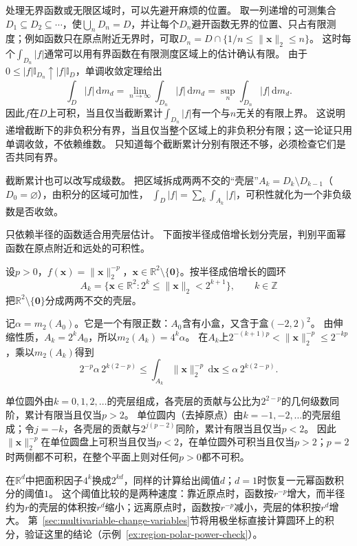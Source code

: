 处理无界函数或无限区域时，可以先避开麻烦的位置。
取一列递增的可测集合$D_1\subseteq D_2\subseteq\cdots$，使$\bigcup_nD_n=D$，并让每个$D_n$避开函数无界的位置、只占有限测度；例如函数只在原点附近无界时，可取$D_n=D\cap\{1/n\leq\lVert\bm x\rVert_2\leq n\}$。
这时每个$\int_{D_n}|f|$通常可以用有界函数在有限测度区域上的估计确认有限。
由于$0\leq|f|\mathbb I_{D_n}\uparrow|f|\mathbb I_D$，单调收敛定理给出
\[
 \int_D|f|\,\mathrm dm_d
 =\lim_{n\to\infty}\int_{D_n}|f|\,\mathrm dm_d
 =\sup_n\int_{D_n}|f|\,\mathrm dm_d.
\]
因此$f$在$D$上可积，当且仅当截断累计$\int_{D_n}|f|$有一个与$n$无关的有限上界。
这说明递增截断下的非负积分有界，当且仅当整个区域上的非负积分有限；这一论证只用单调收敛，不依赖维数。
只知道每个截断累计分别有限还不够，必须检查它们是否共同有界。

截断累计也可以改写成级数。
把区域拆成两两不交的“壳层”$A_k=D_k\setminus D_{k-1}$（$D_0=\varnothing$），由积分的区域可加性，
$\int_D|f|=\sum_k\int_{A_k}|f|$，可积性就化为一个非负级数是否收敛。

只依赖半径的函数适合用壳层估计。
下面按半径成倍增长划分壳层，判别平面幂函数在原点附近和远处的可积性。
\begin{example}
\label{ex:region-power-function-threshold}
设$p>0$，$f(\bm x)=\lVert\bm x\rVert_2^{-p}$，$\bm x\in\mathbb R^2\setminus\{\bm 0\}$。按半径成倍增长的圆环
\[
 A_k=\{\bm x\in\mathbb R^2:2^k\leq\lVert\bm x\rVert_2<2^{k+1}\},\qquad k\in\mathbb Z
\]
把$\mathbb R^2\setminus\{\bm 0\}$分成两两不交的壳层。

记$\alpha=m_2(A_0)$。它是一个有限正数：$A_0$含有小盒，又含于盒$(-2,2)^2$。
由伸缩性质，$A_k=2^kA_0$，所以$m_2(A_k)=4^k\alpha$。
在$A_k$上$2^{-(k+1)p}<\lVert\bm x\rVert_2^{-p}\leq2^{-kp}$，乘以$m_2(A_k)$得到
\[
 2^{-p}\alpha\,2^{k(2-p)}\leq\int_{A_k}\lVert\bm x\rVert_2^{-p}\,\mathrm d\bm x\leq\alpha\,2^{k(2-p)}.
\]

单位圆外由$k=0,1,2,\ldots$的壳层组成，各壳层的贡献与公比为$2^{2-p}$的几何级数同阶，累计有限当且仅当$p>2$。
单位圆内（去掉原点）由$k=-1,-2,\ldots$的壳层组成；令$j=-k$，各壳层的贡献与$2^{j(p-2)}$同阶，累计有限当且仅当$p<2$。
因此$\lVert\bm x\rVert_2^{-p}$在单位圆盘上可积当且仅当$p<2$，在单位圆外可积当且仅当$p>2$；$p=2$时两侧都不可积，在整个平面上则对任何$p>0$都不可积。
\end{example}

在$\mathbb R^d$中把面积因子$4^k$换成$2^{kd}$，同样的计算给出阈值$d$；$d=1$时恢复一元幂函数积分的阈值$1$。
这个阈值比较的是两种速度：靠近原点时，函数按$r^{-p}$增大，而半径约为$r$的壳层的体积按$r^d$缩小；远离原点时，函数按$r^{-p}$减小，壳层的体积按$r^d$增大。
第~\ref{sec:multivariable-change-variables}节将用极坐标直接计算圆环上的积分，验证这里的结论（示例~\ref{ex:region-polar-power-check}）。

